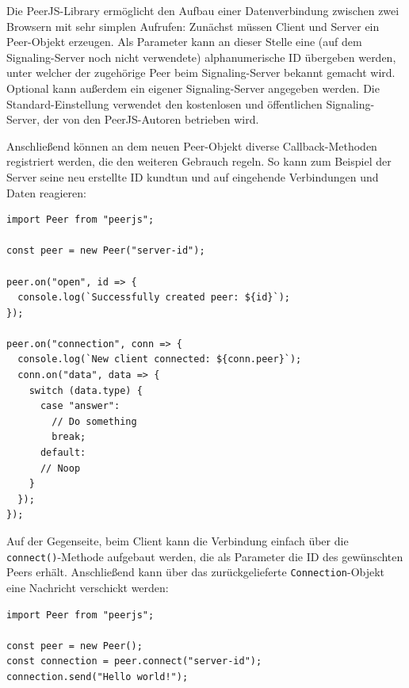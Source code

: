 Die PeerJS-Library ermöglicht den Aufbau einer Datenverbindung zwischen zwei Browsern mit sehr simplen Aufrufen: Zunächst müssen Client und Server ein Peer-Objekt erzeugen. Als Parameter kann an dieser Stelle eine (auf dem Signaling-Server noch nicht verwendete) alphanumerische ID übergeben werden, unter welcher der zugehörige Peer beim Signaling-Server bekannt gemacht wird. Optional kann außerdem ein eigener Signaling-Server angegeben werden. Die Standard-Einstellung verwendet den kostenlosen und öffentlichen Signaling-Server, der von den PeerJS-Autoren betrieben wird.

Anschließend können an dem neuen Peer-Objekt diverse Callback-Methoden registriert werden, die den weiteren Gebrauch regeln. So kann zum Beispiel der Server seine neu erstellte ID kundtun und auf eingehende Verbindungen und Daten reagieren:

\begin{minipage}{\linewidth}
\begin{lstlisting}[caption={Verbindungsaufbau mit der PeerJS-Bibliothek auf der Server-Seite. (aus: src/server/actions/server.js)}]
import Peer from "peerjs";

const peer = new Peer("server-id");

peer.on("open", id => {
  console.log(`Successfully created peer: ${id}`);
});

peer.on("connection", conn => {
  console.log(`New client connected: ${conn.peer}`);
  conn.on("data", data => {
    switch (data.type) {
      case "answer":
        // Do something
        break;
      default:
      // Noop
    }
  });
});
\end{lstlisting}
\end{minipage}

Auf der Gegenseite, beim Client kann die Verbindung einfach über die \texttt{connect()}-Methode aufgebaut werden, die als Parameter die ID des gewünschten Peers erhält. Anschließend kann über das zurückgelieferte \texttt{Connection}-Objekt eine Nachricht verschickt werden:

\begin{minipage}{\linewidth}
\begin{lstlisting}[caption={Verbindungsaufbau mit der PeerJS-Bibliothek auf der Client-Seite. (aus: src/client/actions/client.js)}]
import Peer from "peerjs";

const peer = new Peer();
const connection = peer.connect("server-id");
connection.send("Hello world!");
\end{lstlisting}
\end{minipage}

